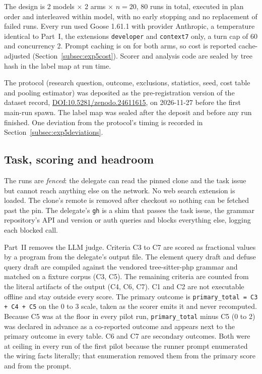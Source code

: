 \documentclass[11pt,a4paper]{article}
\newcommand{\goosever}{1.61.1}
\newcommand{\preregurl}{https://doi.org/10.5281/zenodo.24611615}
\newcommand{\preregdoi}{10.5281/zenodo.24611615}
\begin{document}
The design is 2 models $\times$ 2 arms $\times$ $n{=}20$, 80 runs in total, executed in plan order and interleaved within model, with no early stopping and no replacement of failed runs.
Every run used Goose \goosever{} with provider Anthropic, a temperature identical to Part~I, the extensions \texttt{developer} and \texttt{context7} only, a turn cap of 60 and concurrency 2.
Prompt caching is on for both arms, so cost is reported cache-adjusted (Section~\ref{subsec:exp5cost}).
Scorer and analysis code are sealed by tree hash in the label map at run time.

The protocol (research question, outcome, exclusions, statistics, seed, cost table and pooling estimator) was deposited as the pre-registration version of the dataset record, \href{\preregurl}{DOI:\preregdoi}, on 2026-11-27 before the first main-run spawn.
The label map was sealed after the deposit and before any run finished.
One deviation from the protocol's timing is recorded in Section~\ref{subsec:exp5deviations}.

\subsection{Task, scoring and headroom}

The runs are \emph{fenced}: the delegate can read the pinned clone and the task issue but cannot reach anything else on the network.
No web search extension is loaded.
The clone's remote is removed after checkout so nothing can be fetched past the pin.
The delegate's \texttt{gh} is a shim that passes the task issue, the grammar repository's API and version or auth queries and blocks everything else, logging each blocked call.

Part~II removes the LLM judge.
Criteria C3 to C7 are scored as fractional values by a program from the delegate's output file.
The element query draft and defuse query draft are compiled against the vendored tree-sitter-php grammar and matched on a fixture corpus (C3, C5). The remaining criteria are counted from the literal artifacts of the output (C4, C6, C7).
C1 and C2 are not executable offline and stay outside every score.
The primary outcome is \texttt{primary\_total = C3 + C4 + C5} on the 0 to 3 scale, taken as the scorer emits it and never recomputed.
Because C5 was at the floor in every pilot run, \texttt{primary\_total} minus C5 (0 to 2) was declared in advance as a co-reported outcome and appears next to the primary outcome in every table.
C6 and C7 are secondary outcomes. Both were at ceiling in every run of the first pilot because the runner prompt enumerated the wiring facts literally; that enumeration removed them from the primary score and from the prompt.
\end{document}

